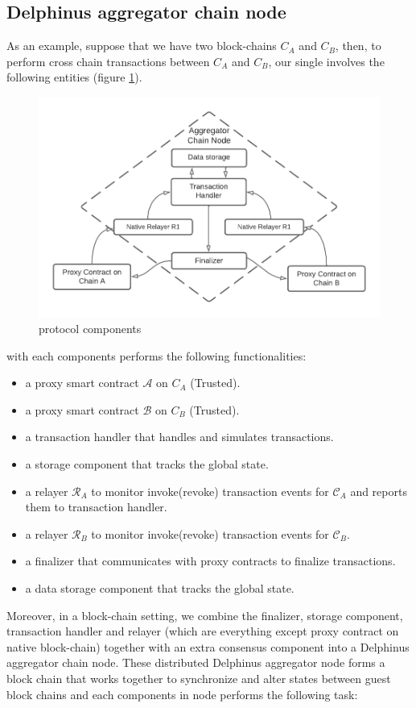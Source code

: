 \documentclass[acmtog, natbib=false]{acmart}
\begin{document}
\subsection{Delphinus aggregator chain node}
As an example, suppose that we have two block-chains $C_{A}$ and $C_{B}$, then, to perform cross chain transactions between $C_A$  and $C_B$, our single \dprotocol involves the following entities (figure \ref{protocol-components}). 
\begin{figure}[ht]
\caption{protocol components}
\label{protocol-components}
\includegraphics[scale=0.5]{components}
\end{figure}

with each components performs the following functionalities:
\begin{itemize}
\item  a proxy smart contract $\mathcal{A}$ on $C_{A}$ (Trusted).
\item  a proxy smart contract $\mathcal{B}$ on $C_{B}$ (Trusted).
\item  a transaction handler that handles and simulates transactions.
\item  a storage component that tracks the global state.
\item  a relayer $\mathcal{R}_A$ to monitor invoke(revoke) transaction events for $\mathcal{C}_A$ and reports them to transaction handler.
\item  a relayer $\mathcal{R}_B$ to monitor invoke(revoke) transaction events for $\mathcal{C}_B$.
\item  a finalizer that communicates with proxy contracts to finalize transactions.
\item  a data storage component that tracks the global state.
\end{itemize}
Moreover, in a block-chain setting, we combine the finalizer, storage component, transaction handler and relayer (which are everything except proxy contract on native block-chain) together with an extra consensus component into a Delphinus aggregator chain node. These distributed Delphinus aggregator node forms a block chain that works together to synchronize and alter states between guest block chains and each components in node performs the following task:
\end{document}

